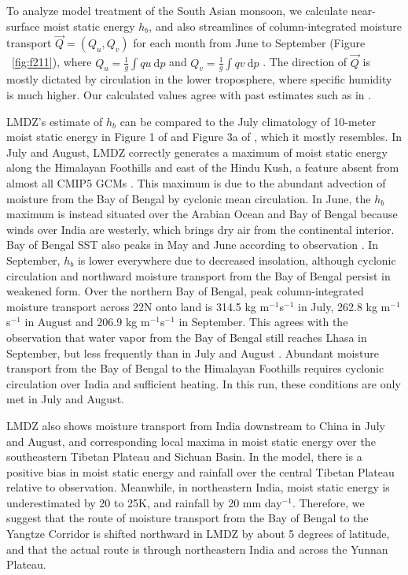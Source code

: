 	To analyze model treatment of the South Asian monsoon, we calculate near-surface moist static energy $h_b$, and also streamlines of column-integrated moisture transport $\vec{Q}=(Q_u,Q_v)$ for each month from June to September (Figure ~\ref{fig:f211}), where $Q_u=\frac{1}{g}\int qu\ \mathrm{d}p$ and $Q_v= \frac{1}{g}\int qv\ \mathrm{d}p$ \citep{Trenberth1991}. The direction of $\vec{Q}$ is mostly dictated by circulation in the lower troposphere, where specific humidity is much higher. Our calculated values agree with past estimates such as in \cite{Feng2012}. 
	
	LMDZ's estimate of $h_b$ can be compared to the July climatology of 10-meter moist static energy in Figure 1 of \cite{Nie2010} and Figure 3a of \cite{Boos2013a}, which it mostly resembles. In July and August, LMDZ correctly generates a maximum of moist static energy along the Himalayan Foothills and east of the Hindu Kush, a feature absent from almost all CMIP5 GCMs \citep{Boos2013a}. This maximum is due to the abundant advection of moisture from the Bay of Bengal by cyclonic mean circulation. In June, the $h_b$ maximum is instead situated over the Arabian Ocean and Bay of Bengal because winds over India are westerly, which brings dry air from the continental interior. Bay of Bengal SST also peaks in May and June according to observation \citep{Bhat2004}. In September, $h_b$ is lower everywhere due to decreased insolation, although cyclonic circulation and northward moisture transport from the Bay of Bengal persist in weakened form. Over the northern Bay of Bengal, peak column-integrated moisture transport across 22\textdegree N onto land is 314.5 kg m$^{-1}$s$^{-1}$ in July, 262.8 kg m$^{-1}$s$^{-1}$ in August and 206.9 kg m$^{-1}$s$^{-1}$ in September. This agrees with the observation that water vapor from the Bay of Bengal still reaches Lhasa in September, but less frequently than in July and August \citep{Gao2011}. Abundant moisture transport from the Bay of Bengal to the Himalayan Foothills requires cyclonic circulation over India and sufficient heating. In this run, these conditions are only met in July and August.
	
	LMDZ also shows moisture transport from India downstream to China in July and August, and corresponding local maxima in moist static energy over the southeastern Tibetan Plateau and Sichuan Basin. In the model, there is a positive bias in moist static energy and rainfall over the central Tibetan Plateau relative to observation. Meanwhile, in northeastern India, moist static energy is underestimated by 20 to 25K, and rainfall by 20 mm day$^{-1}$. Therefore, we suggest that the route of moisture transport from the Bay of Bengal to the Yangtze Corridor is shifted northward in LMDZ by about 5 degrees of latitude, and that the actual route is through northeastern India and across the Yunnan Plateau.

